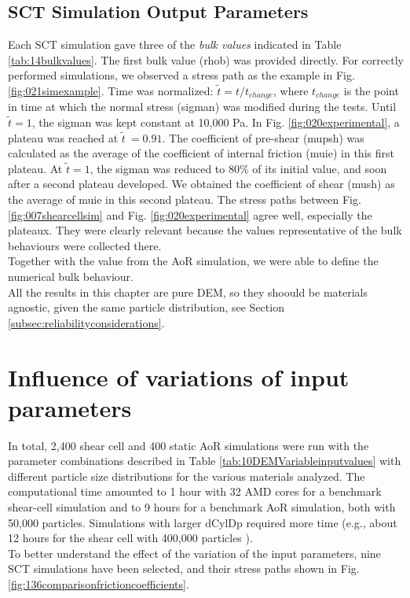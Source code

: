 \subsection{SCT Simulation Output Parameters}
\label{subsec:sctsimulationoutputparameters}


Each \acs{SCT} simulation gave three of the \textit{bulk values} indicated in
Table \ref{tab:14bulkvalues}.
The first bulk value (\acs{rhob}) was provided directly. 
For correctly performed simulations, we
observed a stress path as the example in Fig. \ref{fig:021simexample}.
Time was normalized: $\tilde{t} = t/t_{change}$, where $t_{change}$ is the
point in time at which the normal stress (\acs{sigman}) was modified during the
tests.
Until $\tilde{t}=1$, the \acs{sigman} was kept constant at 10,000 Pa.
In Fig. \ref{fig:020experimental},
a plateau was reached at $\tilde{t}~=0.91$.
The coefficient of pre-shear (\acs{mupsh}) was calculated as the average of the
coefficient of internal friction (\acs{muie}) in this first plateau.
At $\tilde{t}=1$, the \acs{sigman} was reduced to $80 \%$ of its initial
value, and soon after
a second plateau developed.
We obtained the coefficient of
shear (\acs{mush}) as the average of \acs{muie} in this second plateau.
The stress paths between Fig. \ref{fig:007shearcellsim} and Fig.
\ref{fig:020experimental} agree well, especially the plateaux.
They were clearly relevant because
the values representative of the bulk behaviours were collected there.\\
Together with the value from the \acs{AoR} simulation, we were able to define
the numerical bulk behaviour.\\
All the results in this chapter are pure \acs{DEM}, so they shoould be
materials agnostic, given the same particle distribution, see
Section \ref{subsec:reliabilityconsiderations}.



\section{Influence of variations of input parameters}
\label{sec:influence}

In total, 2,400 shear cell and 400 static \acs{AoR} simulations 
were run with
the parameter combinations described in Table
\ref{tab:10DEMVariableinputvalues} with different particle size
distributions for the various materials analyzed.
The computational time amounted to 1 hour with 32 AMD cores for a benchmark
shear-cell simulation and to 9 hours for a benchmark \acs{AoR} simulation, both with
50,000 particles.
Simulations with larger \acs{dCylDp} required more time (e.g., about 12 hours for
the shear cell with 400,000 particles ). \\
To better understand the effect of the variation of the input parameters, nine
\acs{SCT} simulations have been selected, and their stress paths shown in Fig.
\ref{fig:136comparisonfrictioncoefficients}.



